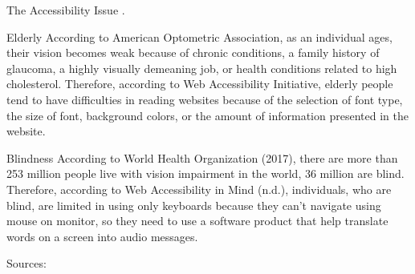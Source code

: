 \documentclass[11pt, titlepage]{article}
\newenvironment{index_me} {
	\begin{adjustwidth}{2cm}{}
}{\end{adjustwidth}}
\newenvironment{doc_heading}[1]
{
     \section*{\sffamily \LARGE \capitalisewords{#1}}
}{}
\newenvironment{doc_subheading}[1]
{
	\begin{index_me}
    \subsection*{\sffamily\Large \capitalisewords{#1}}
}{\end{index_me}}
\begin{document}
\iffalse
Sources:

https://www.aoa.org/patients-and-public/good-vision-throughout-life/adult-vision-19-to-40-years-of-age/adult-vision-41-to-60-years-of-age

https://www.w3.org/WAI/older-users/

https://developer.paciellogroup.com/blog/2011/10/brief-history-of-browser-accessibility-support/

http://www.who.int/en/news-room/fact-sheets/detail/blindness-and-visual-impairment

https://webaim.org/articles/visual/blind
\fi

\vspace{0.5in}
\begin{doc_heading}{The Accessibility Issue}
\color{white}.\vspace{-0.5in}\color{black}
  \begin{doc_subheading}{Elderly}
  	According to American Optometric Association, as an individual ages, their vision becomes weak because of chronic conditions, a family history of glaucoma, a highly visually demeaning job, or health conditions related to high cholesterol. Therefore, according to Web Accessibility Initiative, elderly people tend to have difficulties in reading websites because of the selection of font type, the size of font, background colors, or the amount of information presented in the website.
  \end{doc_subheading}
  \begin{doc_subheading}{Blindness}
  	According to World Health Organization (2017), there are more than 253 million people live with vision impairment in the world, 36 million are blind. Therefore, according to Web Accessibility in Mind (n.d.), individuals, who are blind, are limited in using only keyboards because they can't navigate using mouse on monitor, so they need to use a software product that help translate words on a screen into audio messages.
  \end{doc_subheading}
\end{doc_heading}




\iffalse
Sources:
\end{document}
